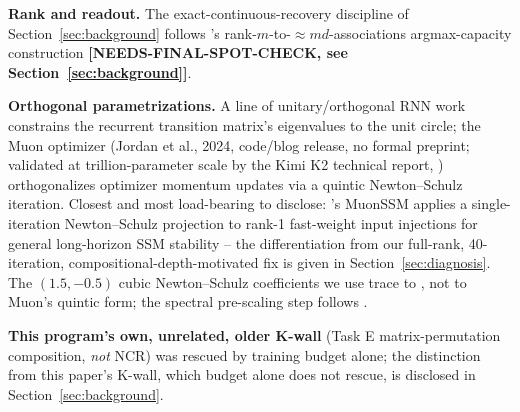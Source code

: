 \textbf{Rank and readout.} The exact-continuous-recovery discipline of
Section~\ref{sec:background} follows \citet{nichani2025understanding}'s
rank-$m$-to-$\approx md$-associations argmax-capacity construction
\textbf{[NEEDS-FINAL-SPOT-CHECK, see Section~\ref{sec:background}]}.

\textbf{Orthogonal parametrizations.} A line of unitary/orthogonal RNN
work \citep{arjovsky2016unitary,helfrich2018orthogonal} constrains the
recurrent transition matrix's eigenvalues to the unit circle; the Muon
optimizer (Jordan et al., 2024, code/blog release, no formal preprint;
validated at trillion-parameter scale by the Kimi K2 technical report,
\citealp{kimiteam2025k2}) orthogonalizes optimizer momentum updates via a
quintic Newton--Schulz iteration. Closest and most load-bearing to
disclose: \citet{nguyen2026muonssm}'s MuonSSM applies a single-iteration
Newton--Schulz projection to rank-1 fast-weight input injections for
general long-horizon SSM stability -- the differentiation from our
full-rank, 40-iteration, compositional-depth-motivated fix is given in
Section~\ref{sec:diagnosis}. The $(1.5,-0.5)$ cubic Newton--Schulz
coefficients we use trace to \citet{bjorck1971iterative}, not to Muon's
quintic form; the spectral pre-scaling step follows
\citet{higham1986computing}.

\textbf{This program's own, unrelated, older K-wall} (Task E
matrix-permutation composition, \emph{not} NCR) was rescued by training
budget alone; the distinction from this paper's K-wall, which budget alone
does not rescue, is disclosed in Section~\ref{sec:background}.
